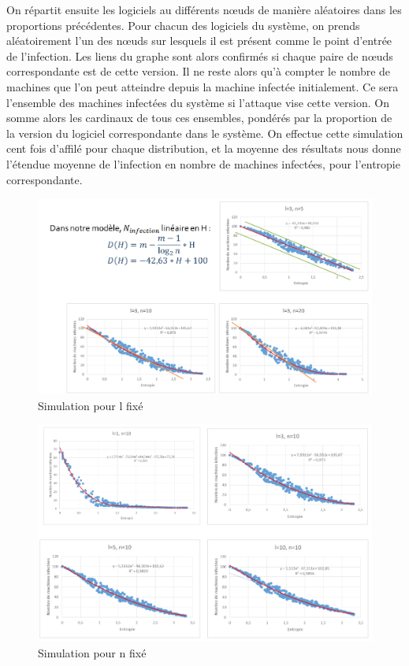 On répartit ensuite les logiciels au différents nœuds de manière aléatoires dans les proportions précédentes.
Pour chacun des logiciels du système, on prends aléatoirement l'un des nœuds sur lesquels il est présent comme le point d'entrée de l'infection. Les liens du graphe sont alors confirmés si chaque paire de nœuds correspondante est de cette version. Il ne reste alors qu'à compter le nombre de machines que l'on peut atteindre depuis la machine infectée initialement. Ce sera l'ensemble des machines infectées du système si l'attaque vise cette version.
On somme alors les cardinaux de tous ces ensembles, pondérés par la proportion de la version du logiciel correspondante dans le système.
On effectue cette simulation cent fois d'affilé pour chaque distribution, et la moyenne des résultats nous donne l'étendue moyenne de l'infection en nombre de machines infectées, pour l'entropie correspondante.


\begin{figure}[ht]
\centering
     \includegraphics[width=1.0\linewidth]{Paul/python/lfixe.png}
     \caption{Simulation pour l fixé}
     \label{lfixe}
\end{figure}

\begin{figure}[ht]
\centering
     \includegraphics[width=1.0\linewidth]{Paul/python/nfixe.png}
     \caption{Simulation pour n fixé}
     \label{nfixe}
\end{figure}